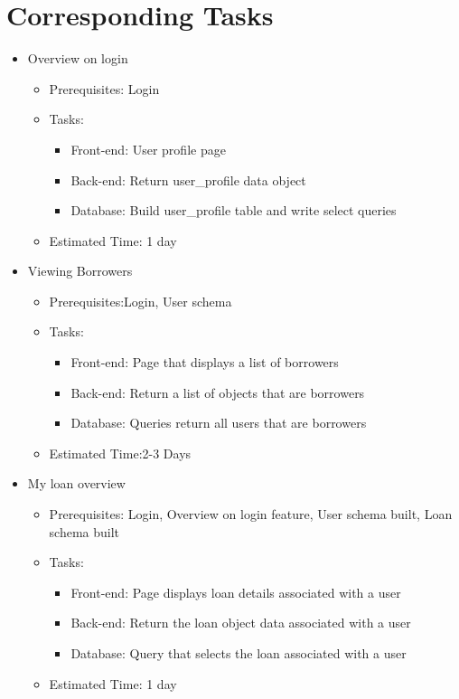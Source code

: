 \section{Corresponding Tasks}

\begin{itemize}
	\item Overview on login
	\begin{itemize}
		\item Prerequisites: Login
		\item Tasks:
		\begin{itemize}
			\item Front-end: User profile page
			\item Back-end: Return user\_profile data object
			\item Database: Build user\_profile table and write select queries
		\end{itemize}
		\item Estimated Time: 1 day
	\end{itemize}

	\item Viewing Borrowers
	\begin{itemize}
		\item Prerequisites:Login, User schema
		\item Tasks:
		\begin{itemize}
			\item Front-end: Page that displays a list of borrowers
			\item Back-end: Return a list of objects that are borrowers
			\item Database: Queries return all users that are borrowers
		\end{itemize}
		\item Estimated Time:2-3 Days
	\end{itemize}

	\item My loan overview
	\begin{itemize}
		\item Prerequisites: Login, Overview on login feature, User schema built, Loan schema built
		\item Tasks:
		\begin{itemize}
			\item Front-end: Page displays loan details associated with a user
			\item Back-end: Return the loan object data associated with a user
			\item Database: Query that selects the loan associated with a user
		\end{itemize}
		\item Estimated Time: 1 day
	\end{itemize}


\end{itemize}
